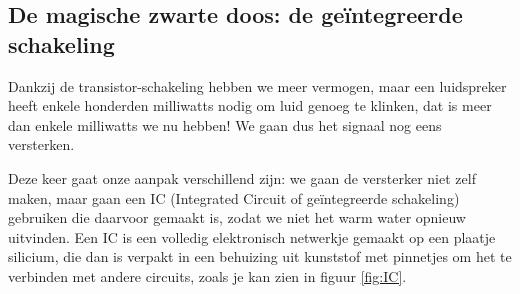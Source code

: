 \documentclass{article}
\begin{document}

		\subsection{De magische zwarte doos: de ge\"integreerde schakeling}
			Dankzij de transistor-schakeling hebben we meer vermogen, maar een luidspreker heeft enkele honderden milliwatts nodig om luid genoeg te klinken, dat is meer dan enkele milliwatts we nu hebben! We gaan dus het signaal nog eens versterken.

			Deze keer gaat onze aanpak verschillend zijn: we gaan de versterker niet zelf maken, maar gaan een IC (Integrated Circuit of ge\"integreerde schakeling) gebruiken die daarvoor gemaakt is, zodat we niet het warm water opnieuw uitvinden. Een IC is een volledig elektronisch netwerkje gemaakt op een plaatje silicium, die dan is verpakt in een behuizing uit kunststof met pinnetjes om het te verbinden met andere circuits, zoals je kan zien in figuur \ref{fig:IC}.
\end{document}
